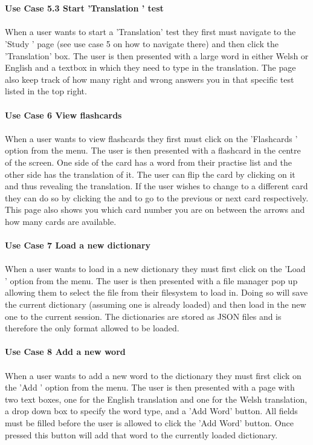 \documentclass{project}
\newcommand*{\icon}[1]{%
  \raisebox{-.3\baselineskip}{%
    \texttt{[image: \#1]}%
  }%
}
\begin{document}
\\\\
\textbf{Use Case 5.3 Start 'Translation ' test}
\\\\
When a user wants to start a 'Translation' test they first must navigate to the 'Study \icon{study-icon}' page (see use case 5 on how to navigate there) and then click the 'Translation' box. The user is then presented with a large word in either Welsh or English and a textbox in which they need to type in the translation. The page also keep track of how many right and wrong answers you in that specific test listed in the top right.
\\\\
\textbf{Use Case 6 View flashcards}
\\\\
When a user wants to view flashcards they first must click on the 'Flashcards \icon{flashcard-icon}' option from the menu. The user is then presented with a flashcard in the centre of the screen. One side of the card has a word from their practise list and the other side has the translation of it. The user can flip the card by clicking on it and thus revealing the translation. If the user wishes to change to a different card they can do so by clicking the \icon{left-icon} and \icon{right-icon} to go to the previous or next card respectively. This page also shows you which card number you are on between the arrows and how many cards are available.
\\\\
\textbf{Use Case 7 Load a new dictionary}
\\\\
When a user wants to load in a new dictionary they must first click on the 'Load \icon{load-icon}' option from the menu. The user is then presented with a file manager pop up allowing them to select the file from their filesystem to load in. Doing so will save the current dictionary (assuming one is already loaded) and then load in the new one to the current session. The dictionaries are stored as JSON files and is therefore the only format allowed to be loaded.
\\\\
\textbf{Use Case 8 Add a new word}
\\\\
When a user wants to add a new word to the dictionary they must first click on the 'Add \icon{add-icon}' option from the menu. The user is then presented with a page with two text boxes, one for the English translation and one for the Welsh translation, a drop down box to specify the word type, and a 'Add Word' button. All fields must be filled before the user is allowed to click the 'Add Word' button. Once pressed this button will add that word to the currently loaded dictionary.
\\\\
\end{document}
